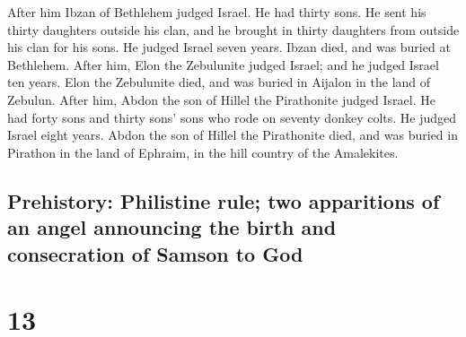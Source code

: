  After him Ibzan of Bethlehem judged Israel.
 He had thirty sons. He sent his thirty daughters outside
his clan, and he brought in thirty daughters from outside his clan for
his sons. He judged Israel seven years.  Ibzan died, and
was buried at Bethlehem.  After him, Elon the Zebulunite
judged Israel; and he judged Israel ten years.  Elon the
Zebulunite died, and was buried in Aijalon in the land of Zebulun.
 After him, Abdon the son of Hillel the Pirathonite
judged Israel.  He had forty sons and thirty sons' sons
who rode on seventy donkey colts. He judged Israel eight years.
 Abdon the son of Hillel the Pirathonite died, and was
buried in Pirathon in the land of Ephraim, in the hill country of the
Amalekites.

\hypertarget{prehistory-philistine-rule-two-apparitions-of-an-angel-announcing-the-birth-and-consecration-of-samson-to-god}{%
\subsection{Prehistory: Philistine rule; two apparitions of an angel
announcing the birth and consecration of Samson to
God}\label{prehistory-philistine-rule-two-apparitions-of-an-angel-announcing-the-birth-and-consecration-of-samson-to-god}}

\hypertarget{section-12}{%
\section{13}\label{section-12}}

